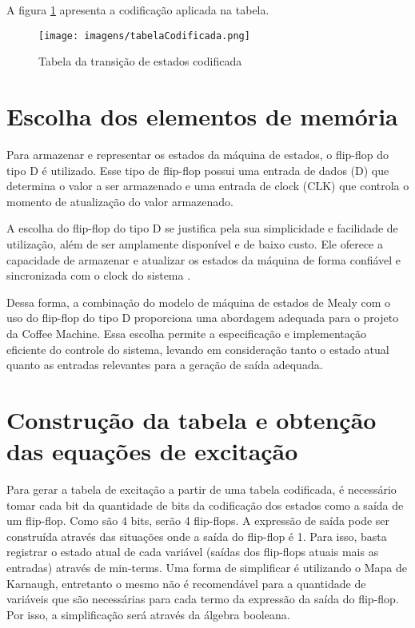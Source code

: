 A figura \ref{fig:tabelaCodificada} apresenta a codificação aplicada na tabela.

\begin{figure}[!h]
    \centering
    \texttt{[image: imagens/tabelaCodificada.png]}
    \caption{Tabela da transição de estados codificada}
    \label{fig:tabelaCodificada}
\end{figure}

\section{Escolha dos elementos de memória}

Para armazenar e representar os estados da máquina de estados, o flip-flop do tipo D é utilizado. Esse tipo de flip-flop possui uma entrada de dados (D) que determina o valor a ser armazenado e uma entrada de clock (CLK) que controla o momento de atualização do valor armazenado.

A escolha do flip-flop do tipo D se justifica pela sua simplicidade e facilidade de utilização, além de ser amplamente disponível e de baixo custo. Ele oferece a capacidade de armazenar e atualizar os estados da máquina de forma confiável e sincronizada com o clock do sistema \cite{floyd}.

Dessa forma, a combinação do modelo de máquina de estados de Mealy com o uso do flip-flop do tipo D proporciona uma abordagem adequada para o projeto da Coffee Machine. Essa escolha permite a especificação e implementação eficiente do controle do sistema, levando em consideração tanto o estado atual quanto as entradas relevantes para a geração de saída adequada.

\section{Construção da tabela e obtenção das equações de excitação}

Para gerar a tabela de excitação a partir de uma tabela codificada, é necessário tomar cada bit da quantidade de bits da codificação dos estados como a saída de um flip-flop. Como são 4 bits, serão 4 flip-flops. A expressão de saída pode ser construída através das situações onde a saída do flip-flop é 1. Para isso, basta registrar o estado atual de cada variável (saídas dos flip-flops atuais mais as entradas) através de min-terms. Uma forma de simplificar é utilizando o Mapa de Karnaugh, entretanto o mesmo não é recomendável para a quantidade de variáveis que são necessárias para cada termo da expressão da saída do flip-flop. Por isso, a simplificação será através da álgebra booleana. 

